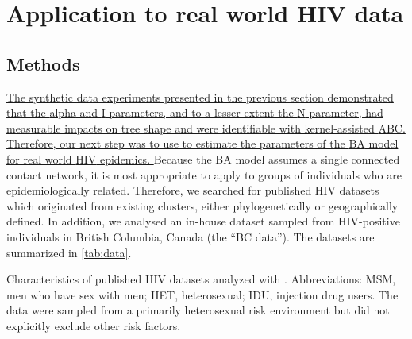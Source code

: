 %
%
%
%    


\section{Application to real world HIV data}
\label{sec:hiv}

\subsection{Methods}

{\color{blue}\uline{
The synthetic data experiments presented in the previous section demonstrated 
that the \gls{alpha} and \gls{I} parameters, and to a lesser extent the \gls{N}
parameter, had measurable impacts on tree shape and were identifiable with
kernel-assisted \gls{ABC}. Therefore, our next step was to use
 to estimate the parameters of the \gls{BA} model for real
world \gls{HIV} epidemics. }} Because the \gls{BA} model assumes a single
connected contact network, it is most appropriate to apply to groups of
individuals who are epidemiologically related. Therefore, we searched for
published \gls{HIV} datasets which originated from existing clusters, either
phylogenetically or geographically defined. In addition, we analysed an
in-house dataset sampled from \gls{HIV}-positive individuals in British
Columbia, Canada (the ``BC data''). The datasets are summarized in
\cref{tab:data}.

\begin{table}[ht]
  \centering
  
  \caption[Characteristics of published HIV datasets analyzed with .]
  {
    Characteristics of published HIV datasets analyzed with . 
    Abbreviations: MSM, men who have sex with men; HET, heterosexual; IDU,
    injection drug users. The \textcite{novitsky2013phylogenetic,novitsky2014impact} data
    were sampled from a primarily heterosexual risk environment but did not
    explicitly exclude other risk factors.
  }
  \label{tab:data}
\end{table}

